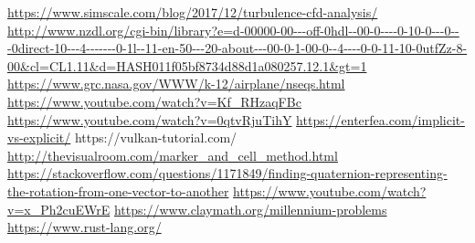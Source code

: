 \documentclass{article}
\begin{document}
\begin{thebibliography}{3}
\url{https://www.simscale.com/blog/2017/12/turbulence-cfd-analysis/}
\url{http://www.nzdl.org/cgi-bin/library?e=d-00000-00---off-0hdl--00-0----0-10-0---0---0direct-10---4-------0-1l--11-en-50---20-about---00-0-1-00-0--4----0-0-11-10-0utfZz-8-00\&cl=CL1.11\&d=HASH011f05bf8734d88d1a080257.12.1\&gt=1}
\url{https://www.grc.nasa.gov/WWW/k-12/airplane/nseqs.html}
\url{https://www.youtube.com/watch?v=Kf_RHzaqFBc}
\url{https://www.youtube.com/watch?v=0qtvRjuTihY}
\url{https://enterfea.com/implicit-vs-explicit/}
https://vulkan-tutorial.com/
\url{http://thevisualroom.com/marker_and_cell_method.html}
\url{https://stackoverflow.com/questions/1171849/finding-quaternion-representing-the-rotation-from-one-vector-to-another}
\url{https://www.youtube.com/watch?v=x_Ph2cuEWrE}
\url{https://www.claymath.org/millennium-problems}
\url{https://www.rust-lang.org/}
\end{thebibliography}
\end{document}
